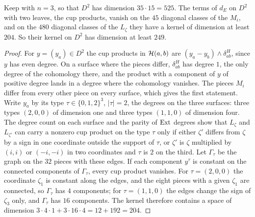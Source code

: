 \begin{proposition}\label{prop:cupkernel}
Keep  with $n=3$, so that $D^{2}$ has dimension
$35\cdot15=525$. The terms of $d_{E}$ on $D^{2}$ with two leaves, the cup
products, vanish on the $45$ diagonal classes of the $M_{i}$, and on the
$480$ diagonal classes of the $L_{\zeta}$ they have a kernel of dimension at
least $204$. So their kernel on $D^{2}$ has dimension at least $249$.
\end{proposition}

\begin{proof}
For $y=(y_{a})\in D^{2}$ the cup products in $\mathcal{H}(a,b)$ are
$(y_{a}-y_{b})\wedge\delta^{H}_{ab}$, since $y$ has even degree. On a surface
where the pieces differ, $\delta^{H}_{ab}$ has degree $1$, the only degree of
the cohomology there, and the product with a component of $y$ of positive
degree lands in a degree where the cohomology vanishes. The pieces $M_{i}$
differ from every other piece on every surface, which gives the first
statement. Write $y_{a}$ by its type $\tau\in\{0,1,2\}^{3}$, $|\tau|=2$, the
degrees on the three surfaces: three types $(2,0,0)$ of dimension one and
three types $(1,1,0)$ of dimension four. The degree count on each surface
and the parity of $\operatorname{Ext}$ degrees show that $L_{\zeta}$ and $L_{\zeta'}$ can
carry a nonzero cup product on the type $\tau$ only if either $\zeta'$
differs from $\zeta$ by a sign in one coordinate outside the support of
$\tau$, or $\zeta'$ is $\zeta$ multiplied by $(i,i)$ or $(-i,-i)$ in two
coordinates and $\tau$ is $2$ on the third. Let $\Gamma_{\tau}$ be the graph
on the $32$ pieces with these edges. If each component $y^{\tau}$ is
constant on the connected components of $\Gamma_{\tau}$, every cup product
vanishes. For $\tau=(2,0,0)$ the coordinate $\zeta_{1}$ is constant along
the edges, and the eight pieces with a given $\zeta_{1}$ are connected, so
$\Gamma_{\tau}$ has $4$ components; for $\tau=(1,1,0)$ the edges change the
sign of $\zeta_{3}$ only, and $\Gamma_{\tau}$ has $16$ components. The
kernel therefore contains a space of dimension $3\cdot4\cdot1+3\cdot16\cdot4
=12+192=204$.
\end{proof}

